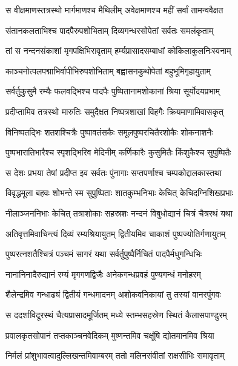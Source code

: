 
\twolineshloka
{स वीक्षमाणस्तत्रस्थो मार्गमाणश्च मैथिलीम्}
{अवेक्षमाणश्च महीं सर्वां तामन्ववैक्षत} %

\twolineshloka
{संतानकलताभिश्च पादपैरुपशोभिताम्}
{दिव्यगन्धरसोपेतां सर्वतः समलंकृताम्} %

\twolineshloka
{तां स नन्दनसंकाशां मृगपक्षिभिरावृताम्}
{हर्म्यप्रासादसम्बाधां कोकिलाकुलनिःस्वनाम्} %

\twolineshloka
{काञ्चनोत्पलपद्माभिर्वापीभिरुपशोभिताम्}
{बह्वासनकुथोपेतां बहुभूमिगृहायुताम्} %

\twolineshloka
{सर्वर्तुकुसुमै रम्यैः फलवद्भिश्च पादपैः}
{पुष्पितानामशोकानां श्रिया सूर्योदयप्रभाम्} %

\twolineshloka
{प्रदीप्तामिव तत्रस्थो मारुतिः समुदैक्षत}
{निष्पत्रशाखां विहगैः क्रियमाणामिवासकृत्} %

\twolineshloka
{विनिष्पतद्भिः शतशश्चित्रैः पुष्पावतंसकैः}
{समूलपुष्परचितैरशोकैः शोकनाशनैः} %

\twolineshloka
{पुष्पभारातिभारैश्च स्पृशद्भिरिव मेदिनीम्}
{कर्णिकारैः कुसुमितैः किंशुकैश्च सुपुष्पितैः} %

\twolineshloka
{स देशः प्रभया तेषां प्रदीप्त इव सर्वतः}
{पुंनागाः सप्तपर्णाश्च चम्पकोद्दालकास्तथा} %

\twolineshloka
{विवृद्धमूला बहवः शोभन्ते स्म सुपुष्पिताः}
{शातकुम्भनिभाः केचित् केचिदग्निशिखप्रभाः} %

\twolineshloka
{नीलाञ्जननिभाः केचित् तत्राशोकाः सहस्रशः}
{नन्दनं विबुधोद्यानं चित्रं चैत्ररथं यथा} %

\twolineshloka
{अतिवृत्तमिवाचिन्त्यं दिव्यं रम्यश्रियायुतम्}
{द्वितीयमिव चाकाशं पुष्पज्योतिर्गणायुतम्} %

\twolineshloka
{पुष्परत्नशतैश्चित्रं पञ्चमं सागरं यथा}
{सर्वर्तुपुष्पैर्निचितं पादपैर्मधुगन्धिभिः} %

\twolineshloka
{नानानिनादैरुद्यानं रम्यं मृगगणद्विजैः}
{अनेकगन्धप्रवहं पुण्यगन्धं मनोहरम्} %

\twolineshloka
{शैलेन्द्रमिव गन्धाढ्यं द्वितीयं गन्धमादनम्}
{अशोकवनिकायां तु तस्यां वानरपुंगवः} %

\twolineshloka
{स ददर्शाविदूरस्थं चैत्यप्रासादमूर्जितम्}
{मध्ये स्तम्भसहस्रेण स्थितं कैलासपाण्डुरम्} %

\twolineshloka
{प्रवालकृतसोपानं तप्तकाञ्चनवेदिकम्}
{मुष्णन्तमिव चक्षूंषि द्योतमानमिव श्रिया} %

\twolineshloka
{निर्मलं प्रांशुभावत्वादुल्लिखन्तमिवाम्बरम्}
{ततो मलिनसंवीतां राक्षसीभिः समावृताम्} %

